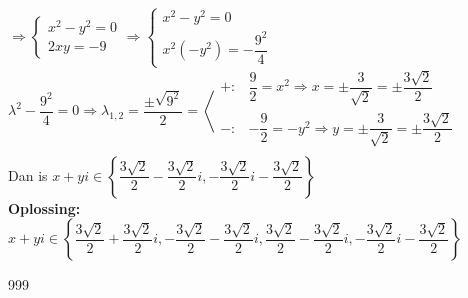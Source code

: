 \documentclass[a4paper]{article}
\begin{document}
$\Rightarrow \left\{\begin{array}{l}
		x^2 - y^2 = 0 \\
		2xy = -9
	\end{array}\right. \Rightarrow \left\{\begin{array}{l}
		x^2 - y^2 = 0 \\
		x^2(-y^2) = -\dfrac{9^2}{4}
	\end{array}\right.$ \\

$\lambda^2 - \dfrac{9^2}{4} = 0 \Rightarrow \lambda_{1,2} = \dfrac{\pm \sqrt{9^2}}{2} = \left<\begin{array}{ll}
		+: & \dfrac{9}{2} = x^2 \Rightarrow x = \pm \dfrac{3}{\sqrt{2}} = \pm \dfrac{3\sqrt{2}}{2}   \\
		-: & -\dfrac{9}{2} = -y^2 \Rightarrow y = \pm \dfrac{3}{\sqrt{2}} = \pm \dfrac{3\sqrt{2}}{2} \\
	\end{array}\right.$ \\

Dan is $x+yi \in \left\{ \dfrac{3\sqrt{2}}{2}-\dfrac{3\sqrt{2}}{2}i, -\dfrac{3\sqrt{2}}{2}i-\dfrac{3\sqrt{2}}{2} \right\}$ \\

\textbf{Oplossing: } $x+yi \in \left\{ \dfrac{3\sqrt{2}}{2}+\dfrac{3\sqrt{2}}{2}i, -\dfrac{3\sqrt{2}}{2}-\dfrac{3\sqrt{2}}{2}i, \dfrac{3\sqrt{2}}{2}-\dfrac{3\sqrt{2}}{2}i, -\dfrac{3\sqrt{2}}{2}i-\dfrac{3\sqrt{2}}{2} \right\}$

\begin{thebibliography}{999}
\end{thebibliography}
\end{document}
